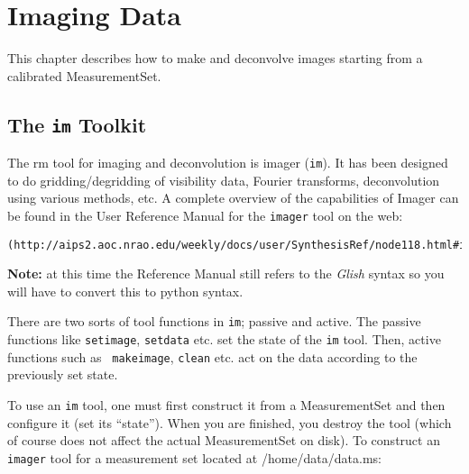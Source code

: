 

\chapter{Imaging Data}
\label{chapter:imtool}

This chapter describes how to make and deconvolve images starting
from a calibrated MeasurementSet.  

\section{The {\tt im} Toolkit}
\label{section:imtool.tools}

The {rm tool} for imaging and deconvolution is imager ({\tt im}).  It
has been designed to do gridding/degridding of visibility data,
Fourier transforms, deconvolution using various methods, etc. A
complete overview of the capabilities of Imager can be found in the
User Reference Manual for the {\tt imager} tool on the web:

\small
\begin{verbatim}
(http://aips2.aoc.nrao.edu/weekly/docs/user/SynthesisRef/node118.html#imager);
\end{verbatim}
\normalsize

\vspace{3mm}
\noindent 
{\bf Note:} at this time the Reference Manual still refers to the {\it
Glish} syntax so you will have to convert this to python syntax.

There are two sorts of tool functions in {\tt im}; passive and active.
The passive functions like {\tt setimage}, {\tt setdata} etc. set the
state of the {\tt im} tool.  Then, active functions such as {\tt
makeimage}, {\tt clean} etc. act on the data according to the
previously set state.

To use an {\tt im} tool, one must first construct it from a
MeasurementSet and then configure it (set its ``state'').  When you
are finished, you destroy the tool (which of course does not affect
the actual MeasurementSet on disk).  To construct an {\tt imager} tool
for a measurement set located at /home/data/data.ms:

